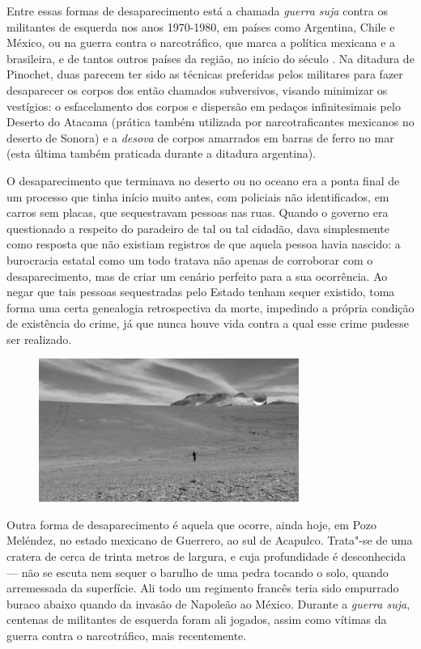 Entre essas formas de desaparecimento está a chamada \emph{guerra suja} contra
os militantes de esquerda nos anos 1970-1980, em países como Argentina, Chile
e México, ou na guerra contra o narcotráfico, que marca a política
mexicana e a brasileira, e de tantos outros países da região, no início do século . Na ditadura de
Pinochet, duas parecem ter sido as técnicas preferidas pelos militares
para fazer desaparecer os corpos dos então chamados subversivos, visando
minimizar os vestígios: o esfacelamento dos corpos e dispersão em
pedaços infinitesimais pelo Deserto do Atacama (prática também utilizada
por narcotraficantes mexicanos no deserto de Sonora) e a \emph{desova}
de corpos amarrados em barras de ferro no mar (esta última também
praticada durante a ditadura argentina).

O desaparecimento que terminava no deserto ou no oceano era a ponta
final de um processo que tinha início muito antes, com policiais não
identificados, em carros sem placas, que sequestravam pessoas nas ruas.
Quando o governo era questionado a respeito do paradeiro de tal ou tal
cidadão, dava simplesmente como resposta que não existiam registros de
que aquela pessoa havia nascido: a burocracia estatal como um todo
tratava não apenas de corroborar com o desaparecimento, mas de criar um
cenário perfeito para a sua ocorrência. Ao negar que tais pessoas
sequestradas pelo Estado tenham sequer existido, toma forma uma certa
genealogia retrospectiva da morte, impedindo a própria condição de
existência do crime, já que nunca houve vida contra a qual esse crime
pudesse ser realizado.

\begin{figure}[!ht]
\centering
 \includegraphics[width=85mm]{./imgs/chile.jpg}
\caption{\tiny{}}
\end{figure}


Outra forma de desaparecimento é aquela que ocorre, ainda hoje, em Pozo
Meléndez, no estado mexicano de Guerrero, ao sul de Acapulco. Trata"-se
de uma cratera de cerca de trinta metros de largura, e cuja profundidade
é desconhecida --- não se escuta nem sequer o barulho de uma pedra tocando
o solo, quando arremessada da superfície. Ali todo um regimento francês
teria sido empurrado buraco abaixo quando da invasão de Napoleão  ao
México. Durante a \emph{guerra suja}, centenas de
militantes de esquerda foram ali jogados, assim como vítimas da guerra
contra o narcotráfico, mais recentemente.


